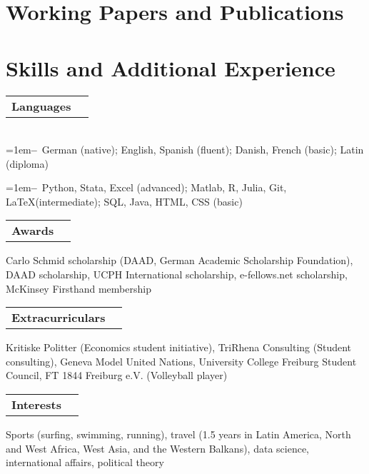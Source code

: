 \documentclass[A4,11pt]{article}
\makeatletter
\newcommand{\Subheading}[4]{   
    \begin{tabular*}{\textwidth}[t]{@{}l @{\extracolsep{\fill}} r@{}}
        \textbf{#1}\textit{\small #2} & \footnotesize #3 \\
    \end{tabular*}
    \small #4 
    \vspace{7pt}
}
\newcommand{\myitem}[1]{\hangindent=1em\hangafter=1\textbf{--}~#1\par}
\makeatother
\begin{document}
\newpage

\section{Working Papers and Publications}
\setlength{}
\begin{refsection}
\nocite{*}
\printbibliography[heading=none]
\end{refsection}

\section{Skills and Additional Experience}

    \Subheading
        {Languages}{}{}
        {\\
        \myitem{German (native); English, Spanish (fluent); Danish, French (basic); Latin (diploma)}
        \myitem{Python, Stata, Excel (advanced); Matlab, R, Julia, Git, \LaTeX\space(intermediate); SQL, Java, HTML, CSS (basic)}
        }
    

    \Subheading
        {Awards}{}{}
        {Carlo Schmid scholarship (DAAD, German Academic Scholarship Foundation), 
        DAAD scholarship, 
        UCPH International scholarship, 
        e-fellows.net scholarship, 
        McKinsey Firsthand membership
        } 

    \Subheading
        {Extracurriculars}{}{}
        {Kritiske Politter (Economics student initiative), TriRhena Consulting (Student consulting), 
        Geneva Model United Nations, University College Freiburg Student Council, FT 1844 Freiburg e.V. (Volleyball player)}{}

    \Subheading
        {Interests}{}{}
        {Sports (surfing, swimming, running), travel (1.5 years in Latin America, North and West Africa, West Asia, and the Western Balkans), data science, international affairs, political theory}

\vfill
{}
\end{document}
